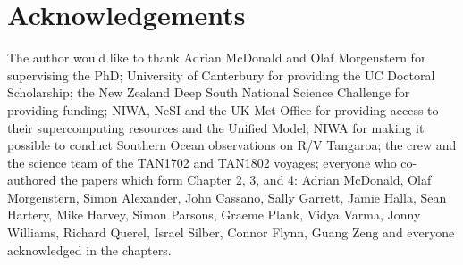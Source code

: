 \chapter*{Acknowledgements}

The author would like to thank Adrian McDonald and Olaf Morgenstern for
supervising the PhD; University of Canterbury for providing the UC Doctoral
Scholarship; the New Zealand Deep South National Science Challenge for providing
funding; NIWA, NeSI and the UK Met Office for providing access to their
supercomputing resources and the Unified Model; NIWA for making it possible to
conduct Southern Ocean observations on R/V Tangaroa; the crew and the science
team of the TAN1702 and TAN1802 voyages; everyone who co-authored the papers
which form Chapter 2, 3, and 4: Adrian McDonald, Olaf Morgenstern, Simon
Alexander, John Cassano, Sally Garrett, Jamie Halla, Sean Hartery, Mike Harvey,
Simon Parsons, Graeme Plank, Vidya Varma, Jonny Williams, Richard Querel, Israel
Silber, Connor Flynn, Guang Zeng and everyone acknowledged in the chapters.
